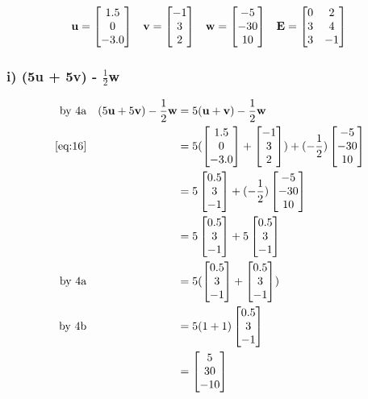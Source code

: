 \documentclass{article}
\begin{document}
\begin{align}
    \label{eq:16}
    \textbf{u} = \begin{bmatrix} 1.5\\ 0\\ -3.0 \end{bmatrix} && \textbf{v} = \begin{bmatrix} -1\\ 3\\ 2 \end{bmatrix} && \textbf{w} = \begin{bmatrix} -5\\ -30\\ 10 \end{bmatrix} && \textbf{E} = \begin{bmatrix} 0 & 2\\ 3 & 4\\ 3 & -1 \end{bmatrix}{}
\end{align}

\subsubsection*{i) (5\textbf{u} + 5\textbf{v}) - $\frac{1}{2}$\textbf{w}}

\begin{align}
    \label{eq:17}
    \text{by 4a} && (5\textbf{u} + 5\textbf{v}) - \frac{1}{2}\textbf{w} &= 5(\textbf{u} + \textbf{v}) - \frac{1}{2}\textbf{w}
    \\
    \label{eq:18}
    \eqref{eq:16} && &= 5(\begin{bmatrix} 1.5\\ 0\\ -3.0 \end{bmatrix} + \begin{bmatrix} -1\\ 3\\ 2 \end{bmatrix}) + (-\frac{1}{2})\begin{bmatrix} -5\\ -30\\ 10 \end{bmatrix}
    \\
    \label{eq:19}
    && &= 5\begin{bmatrix}
    0.5\\3\\-1
    \end{bmatrix}
    +(-\frac{1}{2})\begin{bmatrix} -5\\ -30\\ 10 \end{bmatrix}
    \\
    \label{eq:20}
    && &= 5\begin{bmatrix}
    0.5\\3\\-1
    \end{bmatrix}
    + 5\begin{bmatrix}
    0.5\\3\\-1
    \end{bmatrix}
    \\
    \label{eq:21}
    \text{by 4a} && &= 5(\begin{bmatrix}
    0.5\\3\\-1
    \end{bmatrix} + \begin{bmatrix}
    0.5\\3\\-1
    \end{bmatrix})
    \\
    \label{eq:22}
    \text{by 4b} && &= 5(1 + 1)\begin{bmatrix}
    0.5\\3\\-1
    \end{bmatrix}
    \\
    \label{eq:23}
    && &= \begin{bmatrix}
    5 \\ 30 \\ -10
    \end{bmatrix}
\end{align}
\end{document}
